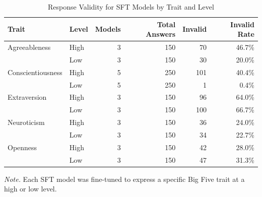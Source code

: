 \begin{table}[htbp]
\begin{threeparttable}
\caption{Response Validity for SFT Models by Trait and Level}
\label{tab:sft_validity}
\centering
\begin{tabular}{llrrrr}
\toprule
Trait & Level & Models & Total Answers & Invalid & Invalid Rate \\
\midrule
  Agreeableness & High & 3 & 150 & 70 & 46.7\% \\
   & Low & 3 & 150 & 30 & 20.0\% \\
\addlinespace
  Conscientiousness & High & 5 & 250 & 101 & 40.4\% \\
   & Low & 5 & 250 & 1 & 0.4\% \\
\addlinespace
  Extraversion & High & 3 & 150 & 96 & 64.0\% \\
   & Low & 3 & 150 & 100 & 66.7\% \\
\addlinespace
  Neuroticism & High & 3 & 150 & 36 & 24.0\% \\
   & Low & 3 & 150 & 34 & 22.7\% \\
\addlinespace
  Openness & High & 3 & 150 & 42 & 28.0\% \\
   & Low & 3 & 150 & 47 & 31.3\% \\
\bottomrule
\end{tabular}
\begin{tablenotes}
\footnotesize
\item \textit{Note.} Each SFT model was fine-tuned to express a specific Big Five trait at a high or low level.
\end{tablenotes}
\end{threeparttable}
\end{table}